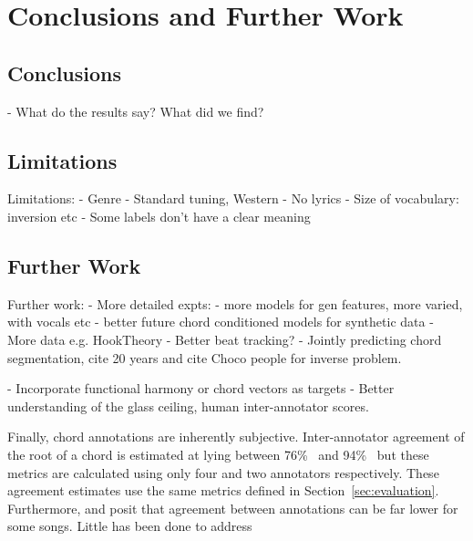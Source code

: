 
\chapter{Conclusions and Further Work}

\section{Conclusions}

- What do the results say? What did we find?

\section{Limitations}
Limitations:
- Genre
- Standard tuning, Western
- No lyrics
- Size of vocabulary: inversion etc
- Some labels don't have a clear meaning

\section{Further Work}
Further work:
- More detailed expts:
    - more models for gen features, more varied, with vocals etc
    - better future chord conditioned models for synthetic data
- More data e.g. HookTheory
- Better beat tracking?
- Jointly predicting chord segmentation, cite 20 years and cite Choco people for inverse problem.

- Incorporate functional harmony or chord vectors as targets
- Better understanding of the glass ceiling, human inter-annotator scores.

Finally, chord annotations are inherently subjective. Inter-annotator agreement of the root of a chord is estimated at lying between 76\%~\citep{AnnotatorAgreement76} and 94\%~\citep{RockHarmonyAnalysis94} but these metrics are calculated using only four and two annotators respectively. These agreement estimates use the same metrics defined in Section~\ref{sec:evaluation}. Furthermore, \citet{FourTimelyInsights} and \citet{UnderstandingSubjectivity} posit that agreement between annotations can be far lower for some songs. Little has been done to address